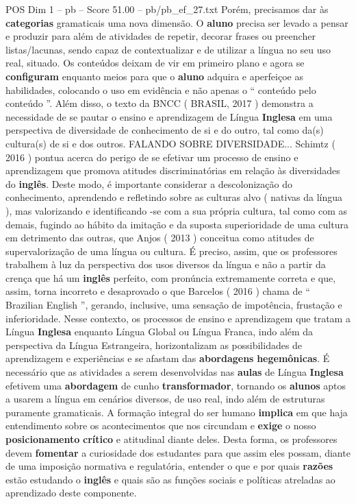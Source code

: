 \begin{textsample}{POS Dim 1 – pb – Score 51.00 – pb/pb\_ef\_27.txt}
Porém, precisamos dar às \textbf{categorias} gramaticais uma nova dimensão.
O \textbf{aluno} precisa ser levado a pensar e produzir para além de atividades de repetir, decorar frases ou preencher listas/lacunas, sendo capaz de contextualizar e de utilizar a língua no seu uso real, situado.
Os conteúdos deixam de vir em primeiro plano e agora se \textbf{configuram} enquanto meios para que o \textbf{aluno} adquira e aperfeiçoe as habilidades, colocando o uso em evidência e não apenas o “ conteúdo pelo conteúdo ”.
Além disso, o texto da BNCC ( BRASIL, 2017 ) demonstra a necessidade de se pautar o ensino e aprendizagem de Língua \textbf{Inglesa} em uma perspectiva de diversidade de conhecimento de si e do outro, tal como da(s) cultura(s) de si e dos outros.
FALANDO SOBRE DIVERSIDADE...
Schimtz ( 2016 ) pontua acerca do perigo de se efetivar um processo de ensino e aprendizagem que promova atitudes discriminatórias em relação às diversidades do \textbf{inglês}.
Deste modo, é importante considerar a descolonização do conhecimento, aprendendo e refletindo sobre as culturas alvo ( nativas da língua ), mas valorizando e identificando -se com a sua própria cultura, tal como com as demais, fugindo ao hábito da imitação e da suposta superioridade de uma cultura em detrimento das outras, que Anjos ( 2013 ) conceitua como atitudes de supervalorização de uma língua ou cultura.
É preciso, assim, que os professores trabalhem à luz da perspectiva dos usos diversos da língua e não a partir da crença que há um \textbf{inglês} perfeito, com pronúncia extremamente correta e que, assim, torna incorreto e desaprovado o que Barcelos ( 2016 ) chama de “ Brazilian English ”, gerando, inclusive, uma sensação de impotência, frustação e inferioridade.
Nesse contexto, os processos de ensino e aprendizagem que tratam a Língua \textbf{Inglesa} enquanto Língua Global ou Língua Franca, indo além da perspectiva da Língua Estrangeira, horizontalizam as possibilidades de aprendizagem e experiências e se afastam das \textbf{abordagens} \textbf{hegemônicas}.
É necessário que as atividades a serem desenvolvidas nas \textbf{aulas} de Língua \textbf{Inglesa} efetivem uma \textbf{abordagem} de cunho \textbf{transformador}, tornando os \textbf{alunos} aptos a usarem a língua em cenários diversos, de uso real, indo além de estruturas puramente gramaticais.
A formação integral do ser humano \textbf{implica} em que haja entendimento sobre os acontecimentos que nos circundam e \textbf{exige} o nosso \textbf{posicionamento} \textbf{crítico} e atitudinal diante deles.
Desta forma, os professores devem \textbf{fomentar} a curiosidade dos estudantes para que assim eles possam, diante de uma imposição normativa e regulatória, entender o que e por quais \textbf{razões} estão estudando o \textbf{inglês} e quais são as funções sociais e políticas atreladas ao aprendizado deste componente.

\end{textsample}

